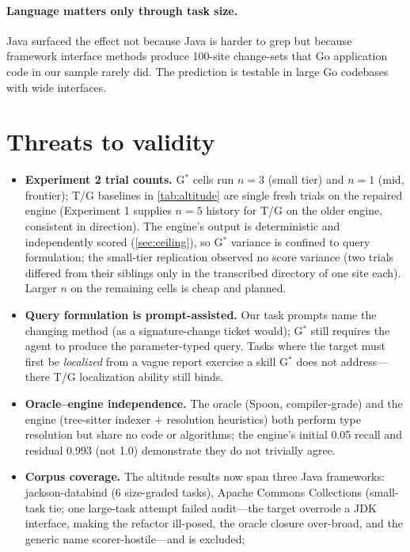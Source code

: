 \documentclass[11pt]{article}
\newcommand{\gstar}{G$^{*}$}
\begin{document}
\paragraph{Language matters only through task size.} Java surfaced the effect
not because Java is harder to grep but because framework interface methods
produce 100-site change-sets that Go application code in our sample rarely did.
The prediction is testable in large Go codebases with wide interfaces.

\section{Threats to validity}
\label{sec:threats}
\begin{itemize}[leftmargin=*]
\item \textbf{Experiment 2 trial counts.} \gstar{} cells run $n{=}3$ (small
tier) and $n{=}1$ (mid, frontier); T/G baselines in \cref{tab:altitude} are
single fresh trials on the repaired engine (Experiment 1 supplies $n{=}5$
history for T/G on the older engine, consistent in direction). The engine's
output is deterministic and independently scored (\cref{sec:ceiling}), so
\gstar{} variance is confined to query formulation; the small-tier replication
observed no score variance (two trials differed from their siblings only in
the transcribed directory of one site each). Larger $n$ on the remaining cells
is cheap and planned.
\item \textbf{Query formulation is prompt-assisted.} Our task prompts name the
changing method (as a signature-change ticket would); \gstar{} still requires the
agent to produce the parameter-typed query. Tasks where the target must first be
\emph{localized} from a vague report exercise a skill \gstar{} does not
address---there T/G localization ability still binds.
\item \textbf{Oracle--engine independence.} The oracle (Spoon, compiler-grade)
and the engine (tree-sitter indexer + resolution heuristics) both perform type
resolution but share no code or algorithms; the engine's initial 0.05 recall and
residual 0.993 (not 1.0) demonstrate they do not trivially agree.
\item \textbf{Corpus coverage.} The altitude results now span three Java
frameworks: jackson-databind (6 size-graded tasks), Apache Commons
Collections (small-task tie; one large-task attempt failed audit---the
target overrode a JDK interface, making the refactor ill-posed, the oracle
closure over-broad, and the generic name scorer-hostile---and is excluded;

\end{itemize}
\end{document}

